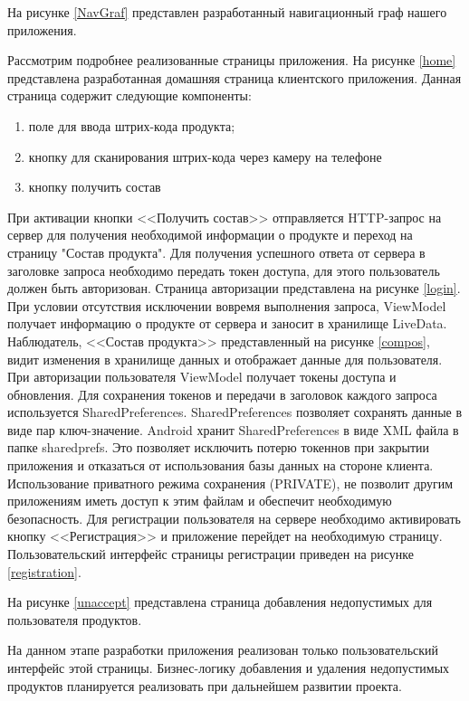 На рисунке \ref{NavGraf} представлен разработанный навигационный граф нашего приложения.


Рассмотрим подробнее реализованные страницы приложения. На рисунке \ref{home} представлена разработанная домашняя страница клиентского приложения. Данная страница содержит следующие компоненты:
\begin{enumerate}
	\item поле для ввода штрих-кода продукта;
	\item кнопку для сканирования штрих-кода через камеру на телефоне
	\item кнопку получить состав
\end{enumerate}

При активации кнопки <<Получить состав>> отправляется HTTP-запрос на сервер для получения необходимой информации о продукте и переход на страницу "Состав продукта". Для получения успешного ответа от сервера в заголовке запроса необходимо передать токен доступа, для этого пользователь должен быть авторизован. Страница авторизации представлена на рисунке \ref{login}.
При условии отсутствия исключении вовремя выполнения запроса, ViewModel получает информацию о продукте от сервера и заносит в хранилище LiveData. Наблюдатель, <<Состав продукта>> представленный на рисунке \ref{compos}, видит изменения в хранилище данных и отображает данные для пользователя. 
При авторизации пользователя ViewModel получает токены доступа и обновления. Для сохранения токенов и передачи в заголовок каждого запроса  используется SharedPreferences\cite{11}. SharedPreferences позволяет  сохранять данные в виде пар ключ-значение. Android хранит SharedPreferences в виде XML файла в папке sharedprefs. Это позволяет исключить потерю токеннов при закрытии приложения и отказаться от использования базы данных на стороне клиента. Использование приватного режима сохранения (PRIVATE), не позволит другим приложениям иметь доступ к этим файлам и обеспечит необходимую безопасность. Для регистрации пользователя на сервере необходимо активировать кнопку <<Регистрация>> и приложение перейдет на необходимую страницу. Пользовательский интерфейс страницы регистрации приведен на рисунке \ref{registration}.




На рисунке \ref{unaccept} представлена страница добавления  недопустимых для пользователя продуктов.


На данном этапе разработки приложения реализован только пользовательский интерфейс этой страницы.  Бизнес-логику добавления и удаления недопустимых продуктов планируется реализовать при дальнейшем развитии проекта.










\clearpage